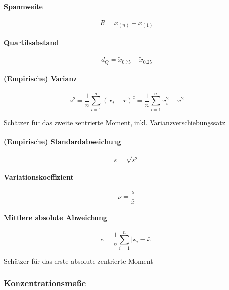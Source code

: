 \documentclass[10pt]{article}
\begin{document}
\begin{multicols}{2}

\paragraph{Spannweite}

$$R=x_{(n)}-x_{(1)}$$

\paragraph{Quartilsabstand}

$$d_Q=\tilde{x}_{0.75}-\tilde{x}_{0.25}$$

\paragraph{(Empirische) Varianz}

$$s^2=\frac{1}{n}\sum\limits_{i=1}^n(x_i-\bar{x})^2=\frac{1}{n}\sum\limits_{i=1}^nx_i^2-\bar{x}^2$$

\noindent Schätzer für das zweite zentrierte Moment, inkl. Varianzverschiebungssatz

\paragraph{(Empirische) Standardabweichung}

$$s=\sqrt{s^2}$$

\paragraph{Variationskoeffizient}

$$ \nu=\frac{s}{\bar{x}}$$

\paragraph{Mittlere absolute Abweichung}


$$ \mathit{e} = \frac{1}{n}\sum_{i=1}^n \left|x_i - \bar{x}\right|$$

Schätzer für das erste absolute zentrierte Moment 



\end{multicols}

\subsubsection{Konzentrationsmaße}
\end{document}
